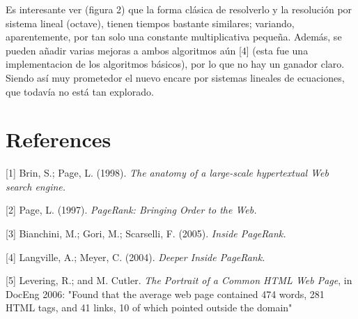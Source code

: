 \documentclass[%
    final,
    notitlepage,
    narroweqnarray,
    inline,
    twoside,
    invited
    ]{lib/ieee}
\begin{document}
Es interesante ver (figura 2) que la forma clásica de resolverlo y la resolución por sistema lineal (octave), tienen tiempos bastante similares;
 variando, aparentemente, por tan solo una constante multiplicativa pequeña.
Además, se pueden añadir varias mejoras a ambos algoritmos aún [4] (esta fue una implementacion de los algoritmos básicos), por lo que
 no hay un ganador claro.
Siendo así muy prometedor el nuevo encare por sistemas lineales de ecuaciones, que todavía no está tan explorado.

%
%
%
%
%

\newpage

\section{References}

    [1] Brin, S.; Page, L. (1998). \emph{The anatomy of a large-scale hypertextual Web search engine.}

    [2] Page, L. (1997). \emph{PageRank: Bringing Order to the Web.}

    [3] Bianchini, M.; Gori, M.; Scarselli, F. (2005). \emph{Inside PageRank.}

    [4] Langville, A.; Meyer, C. (2004). \emph{Deeper Inside PageRank.}

    [5] Levering, R.; and M. Cutler. \emph{The Portrait of a Common HTML Web Page}, in DocEng 2006: "Found that the average web page contained 474 words, 281 HTML tags, and 41 links, 10 of which pointed outside the domain"
\end{document}
